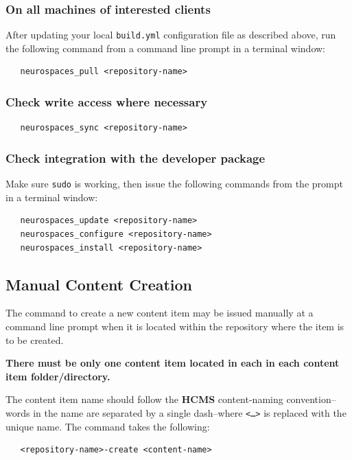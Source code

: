 \documentclass[12pt]{article}
\begin{document}
\subsubsection*{On all machines of interested clients}
After updating your local {\tt \small build.yml} configuration file as described above, run the following command from a command line prompt in a terminal window:
\begin{verbatim}
   neurospaces_pull <repository-name>
\end{verbatim}

\subsubsection*{Check write access where necessary}

\begin{verbatim}
   neurospaces_sync <repository-name>
\end{verbatim}

\subsubsection*{Check integration with the developer package}

Make sure {\tt \small sudo} is working, then issue the following commands from the prompt in a terminal window:

\begin{verbatim}
   neurospaces_update <repository-name>
   neurospaces_configure <repository-name>
   neurospaces_install <repository-name>
\end{verbatim}

\subsection*{Manual Content Creation}

The command to create a new content item may be issued manually at a command line prompt when it is located within the repository where the item is to be created.

{\bf There must be only one content item located in each in each content item folder/directory.}

The content item name should follow the {\bf \small HCMS} content-naming convention--words in the name are separated by a single dash--where {\tt <\dots>} is replaced with the unique name. The command takes the following:
\begin{verbatim}
   <repository-name>-create <content-name>
\end{verbatim}
\end{document}
